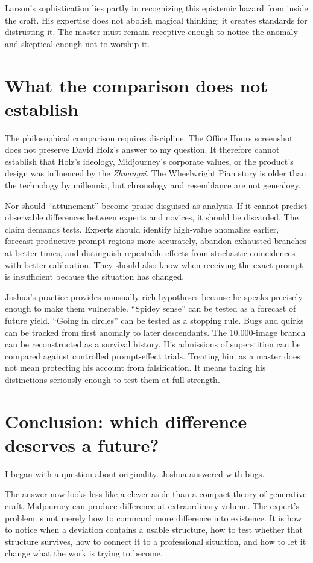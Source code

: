 \documentclass[11pt]{article}
\begin{document}
Larson's sophistication lies partly in recognizing this epistemic hazard from inside the craft. His expertise does not abolish magical thinking; it creates standards for distrusting it. The master must remain receptive enough to notice the anomaly and skeptical enough not to worship it.

\section{What the comparison does not establish}
The philosophical comparison requires discipline. The Office Hours screenshot does not preserve David Holz's answer to my question. It therefore cannot establish that Holz's ideology, Midjourney's corporate values, or the product's design was influenced by the \emph{Zhuangzi}. The Wheelwright Pian story is older than the technology by millennia, but chronology and resemblance are not genealogy.

Nor should ``attunement'' become praise disguised as analysis. If it cannot predict observable differences between experts and novices, it should be discarded. The claim demands tests. Experts should identify high-value anomalies earlier, forecast productive prompt regions more accurately, abandon exhausted branches at better times, and distinguish repeatable effects from stochastic coincidences with better calibration. They should also know when receiving the exact prompt is insufficient because the situation has changed.

Joshua's practice provides unusually rich hypotheses because he speaks precisely enough to make them vulnerable. ``Spidey sense'' can be tested as a forecast of future yield. ``Going in circles'' can be tested as a stopping rule. Bugs and quirks can be tracked from first anomaly to later descendants. The 10,000-image branch can be reconstructed as a survival history. His admissions of superstition can be compared against controlled prompt-effect trials. Treating him as a master does not mean protecting his account from falsification. It means taking his distinctions seriously enough to test them at full strength.

\section{Conclusion: which difference deserves a future?}
I began with a question about originality. Joshua answered with bugs.

The answer now looks less like a clever aside than a compact theory of generative craft. Midjourney can produce difference at extraordinary volume. The expert's problem is not merely how to command more difference into existence. It is how to notice when a deviation contains a usable structure, how to test whether that structure survives, how to connect it to a professional situation, and how to let it change what the work is trying to become.
\end{document}
